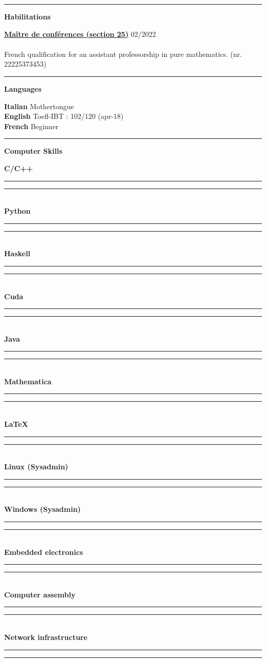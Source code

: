 \documentclass[a4paper]{article}
\newcommand{\crule}[3][black]{\textcolor{#1}{\rule{#2}{#3}}}
\newcommand{\progbar}[4][black]{\crule[#1]{#3}{#4}\crule[#1!10!white!90]{#2}{#4}}
\newcommand{\block}[1]{\hrule \vspace{0.2cm} \textbf{\Large #1} \vspace{0.2cm}}
\newcommand{\voice}[5]{\href{#4}{\textbf{#1}} \hfill #2 \\ \textit{#3} \\ {\small #5} \vspace{0.2cm} \\}
\newcommand{\skill}[2]{\textbf{#1} \hfill #2 \\}
\newcommand{\skillbar}[4]{\textbf{#1} \hfill \progbar{#2}{#3}{#4} \\}
\begin{document}
\begin{minipage}[t]{0.375\columnwidth}


    \block{Habilitations}

    
    \voice{Maître de conférences (section 25)}
        {02/2022}
        {\vspace{-0.5cm}}
        {https://www.galaxie.enseignementsup-recherche.gouv.fr/ensup/qualification/Resultats_2022/qualifies_MCF_2022.pdf}       
        {French qualification for an assistant professorship in pure mathematics.  (nr. 22225373453)}





    \block{Languages} 
    
    
    \skill{Italian}{Mothertongue}
    \skill{English}{Toefl-IBT : 102/120 (apr-18)}
    \skill{French}{Beginner}





    \block{Computer Skills} 
    
    
    \skillbar{C/C++}
    {1.4cm}
    {0.6cm}
    {0.25cm}
    \skillbar{Python}
    {1.1cm}
    {0.9cm}
    {0.25cm}
    \skillbar{Haskell}
    {1.5cm}
    {0.5cm}
    {0.25cm}
    \skillbar{Cuda}
    {1.1cm}
    {0.9cm}
    {0.25cm}
    \skillbar{Java}
    {1.2cm}
    {0.8cm}
    {0.25cm}
    \skillbar{Mathematica}
    {1.4cm}
    {0.6cm}
    {0.25cm}
    \skillbar{\LaTeX}
    {0.5cm}
    {1.5cm}
    {0.25cm}
    \skillbar{Linux (Sysadmin)}
    {0.7cm}
    {1.3cm}
    {0.25cm}
    \skillbar{Windows (Sysadmin)}
    {0.7cm}
    {1.3cm}
    {0.25cm}
    \skillbar{Embedded electronics}
    {1.5cm}
    {0.5cm}
    {0.25cm}
    \skillbar{Computer assembly}
    {1.0cm}
    {1.0cm}
    {0.25cm}
    \skillbar{Network infrastructure}
    {1.6cm}
    {0.4cm}
    {0.25cm}




\end{minipage}


 
\end{document}
